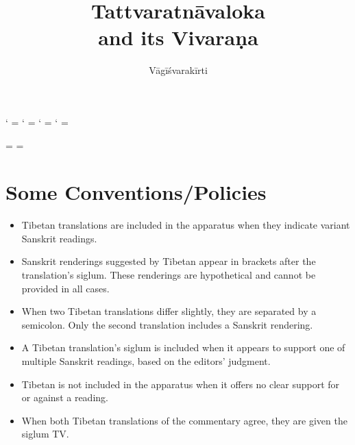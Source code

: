 \documentclass[12pt]{book}
\title{Tattvaratnāvaloka\\ and its Vivaraṇa}
\author{Vāgīśvarakīrti}
\begin{document}
\maketitle

\makeatletter
\newXeTeXintercharclass\noextraclass
\XeTeXcharclass `\? = \noextraclass
\XeTeXcharclass `\! = \noextraclass
\XeTeXcharclass `\; = \noextraclass
\XeTeXcharclass `\: = \noextraclass

\AddOpEmph{|}
\AddOpEmph{/}

 \noextraclass = {\nobreak}
\XeTeXinterchartoks {} = {\nobreak}
\makeatother

\newcommand{\PCreading}{$^{pc}$}
\newcommand{\ACreading}{$^{ac}$}
\newcommand{\MS}{K}
\newcommand{\EDD}{E\textsubscript{DH}}
\newcommand{\TM}{TM\textsubscript{D}}
\newcommand{\TVA}{TVA\textsubscript{D}}
\newcommand{\TVB}{TVB\textsubscript{G}}
\newcommand{\TIB}{TV}
\newcommand{\sigmareading}[1]{$\Sigma$\textsubscript{#1}}

\newcommand{\emd} {\emph{em.}}
\newcommand{\conj} {\emph{conj.}}
\newcommand{\possibleemd} {\emph{possible em.}}
\newcommand{\possibleconj} {\emph{possible conj.}}
\newcommand{\corr} {\emph{corr.}}
\newcommand{\diag} {\emph{diag.\ conj.}}

\section*{Some Conventions/Policies}
\begin{itemize}
    \item Tibetan translations are included in the apparatus when they indicate variant Sanskrit readings.
    
    \item Sanskrit renderings suggested by Tibetan appear in brackets after the translation's siglum. These renderings are hypothetical and cannot be provided in all cases.
    
    \item When two Tibetan translations differ slightly, they are separated by a semicolon. Only the second translation includes a Sanskrit rendering.
    
    \item A Tibetan translation's siglum is included when it appears to support one of multiple Sanskrit readings, based on the editors' judgment.
    
    \item Tibetan is not included in the apparatus when it offers no clear support for or against a reading.

	\item When both Tibetan translations of the commentary agree, they are given the siglum \TIB .
\end{itemize}
\end{document}
